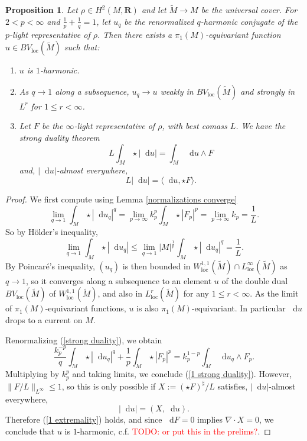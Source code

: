 \documentclass[reqno,11pt]{amsart}
\newcommand{\RR}{\mathbf{R}}
\newcommand*\dif{\mathop{}\!\mathrm{d}}
\newcommand{\loc}{\mathrm{loc}}
\newtheorem{proposition}[theorem]{Proposition}
\theoremstyle{definition}
\numberwithin{equation}{section}
\newcommand\todo[1]{\textcolor{red}{TODO: #1}}
\begin{document}
\begin{proposition}\label{existence 1}
Let $\rho \in H^2(M, \RR)$ and let $\tilde M \to M$ be the universal cover.
For $2 < p < \infty$ and $\frac{1}{p} + \frac{1}{q} = 1$, let $u_q$ be the renormalized $q$-harmonic conjugate of the $p$-light representative of $\rho$.
Then there exists a $\pi_1(M)$-equivariant function $u \in BV_\loc(\tilde M)$ such that:
\begin{enumerate}
\item $u$ is $1$-harmonic.
\item As $q \to 1$ along a subsequence, $u_q \to u$ weakly in $BV_\loc(\tilde M)$ and strongly in $L^r$ for $1 \leq r < \infty$.
\item Let $F$ be the $\infty$-light representative of $\rho$, with best comass $L$. We have the strong duality theorem 
\begin{equation}\label{1 strong duality}
	L \int_M \star |\dif u| = \int_M \dif u \wedge F
\end{equation}
and, $|\dif u|$-almost everywhere,
\begin{equation}\label{1 extremality}
L |\dif u| = \langle \dif u, \star F\rangle.
\end{equation}
\end{enumerate}
\end{proposition}
\begin{proof}
We first compute using Lemma \ref{normalizations converge}
\begin{equation}\label{Lqs of qLaplace converge}
\lim_{q \to 1} \int_M \star |\dif u_q|^q = \lim_{p \to \infty} k_p^p \int_M \star |F_p|^p = \lim_{p \to \infty} k_p = \frac{1}{L}.
\end{equation}
So by H\"older's inequality,
$$\lim_{q \to 1} \int_M \star |\dif u_q| \leq \lim_{q \to 1} |M|^{\frac{1}{p}} \int_M \star |\dif u_q|^q = \frac{1}{L}.$$
By Poincar\'e's inequality, $(u_q)$ is then bounded in $W^{1, 1}_\loc(\tilde M) \cap L^\infty_\loc(\tilde M)$ as $q \to 1$, so it converges along a subsequence to an element $u$ of the double dual $BV_\loc(\tilde M)$ of $W^{1, 1}_\loc(\tilde M)$, and also in $L^r_\loc(\tilde M)$ for any $1 \leq r < \infty$.
As the limit of $\pi_1(M)$-equivariant functions, $u$ is also $\pi_1(M)$-equivariant.
In particular $\dif u$ drops to a current on $M$.

Renormalizing (\ref{strong duality}), we obtain 
$$\frac{k_p^{-p}}{q} \int_M \star |\dif u_q|^q + \frac{1}{p} \int_M \star |F_p|^p = k_p^{1 - p} \int_M \dif u_q \wedge F_p.$$
Multiplying by $k_p^p$ and taking limits, we conclude (\ref{1 strong duality}).
However, $\|F/L\|_{L^\infty} \leq 1$, so this is only possible if $X := (\star F)^\sharp/L$ satisfies, $|\dif u|$-almost everywhere,
$$|\dif u| = (X, \dif u).$$
Therefore (\ref{1 extremality}) holds, and since $\dif F = 0$ implies $\nabla \cdot X = 0$, we conclude that $u$ is $1$-harmonic, c.f. \cite{Mazon14} \todo{or put this in the prelims?}.
\end{proof}
\end{document}
